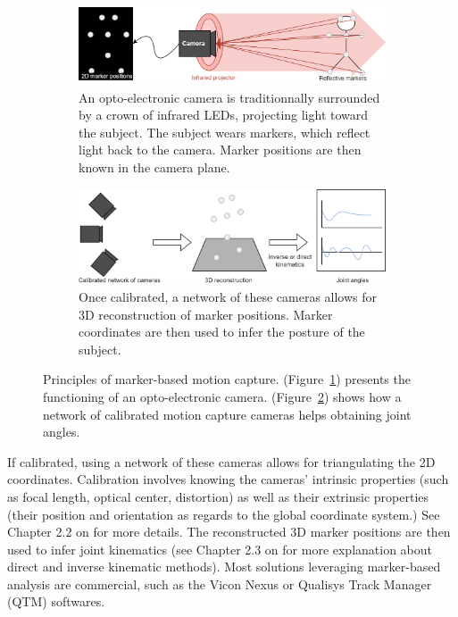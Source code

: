 \begin{figure}[hbtp]
	\centering
	\begin{subfigure}[b]{1\textwidth}
		\centering
		\def\svgwidth{\columnwidth}
		\fontsize{10pt}{10pt}\selectfont
		\includegraphics[width=\linewidth]{"../Chap1/Figures/Fig_Markers_1.png"}
		\caption{An opto-electronic camera is traditionnally surrounded by a crown of infrared LEDs, projecting light toward the subject. The subject wears markers, which reflect light back to the camera. Marker positions are then known in the camera plane.}
		\label{fig_mk1}
	\end{subfigure}
	\qquad
	\begin{subfigure}[b]{1\textwidth}
		\centering
		\def\svgwidth{\columnwidth}
		\fontsize{10pt}{10pt}\selectfont
		\includegraphics[width=\linewidth]{"../Chap1/Figures/Fig_Markers_2.png"}
		\caption{Once calibrated, a network of these cameras allows for 3D reconstruction of marker positions. Marker coordinates are then used to infer the posture of the subject.}
		\label{fig_mk2}
	\end{subfigure}
	\caption{Principles of marker-based motion capture. (Figure~\ref{fig_mk1}) presents the functioning of an opto-electronic camera. (Figure~\ref{fig_mk2}) shows how a network of calibrated motion capture cameras helps obtaining joint angles.}
	\label{fig_mk}
\end{figure}

\clearpage
If calibrated, using a network of these cameras allows for triangulating the 2D coordinates. Calibration involves knowing the cameras' intrinsic properties (such as focal length, optical center, distortion) as well as their extrinsic properties (their position and orientation as regards to the global coordinate system.) See Chapter 2.2 on  for more details. The reconstructed 3D marker positions are then used to infer joint kinematics (see Chapter 2.3 on  for more explanation about direct and inverse kinematic methods). Most solutions leveraging marker-based analysis are commercial, such as the Vicon Nexus \cite{Qualisys2022} or Qualisys Track Manager (QTM) \cite{Vicon2022} softwares.


